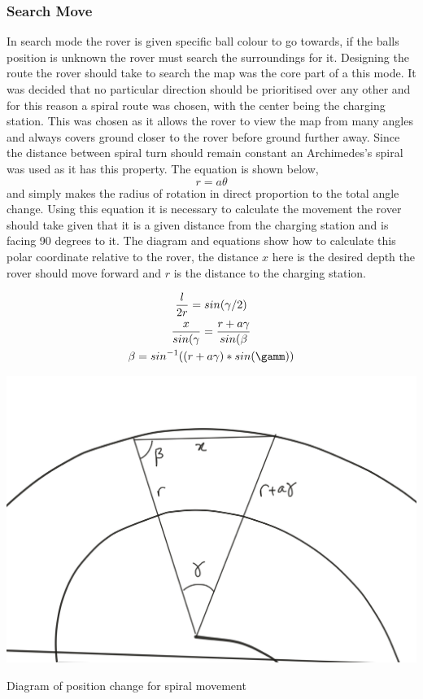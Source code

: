 \documentclass[10pt,twoside]{article}
\begin{document}
\subsubsection{Search Move}
In  search mode the rover is given specific ball colour to go towards, if the balls position is unknown the rover must search the surroundings for it. Designing the route the rover should take to search the map was the core part of a this mode. It was decided that no particular direction should be prioritised over any other and for this reason a spiral route was chosen, with the center being the charging station. This was chosen as it allows the rover to view the map from many angles and always covers ground closer to the rover before ground further away. Since the distance between spiral turn should remain constant an Archimedes's spiral was used as it has this property. The equation is shown below,
$$
r = a\theta
$$
and simply makes the radius of rotation in direct proportion to the total angle change. Using this equation it is necessary to calculate the movement the rover should take given that it is a given distance from the charging station and is facing 90 degrees to it. The diagram and equations show how to calculate this polar coordinate relative to the rover, the distance $x$ here is the desired depth the rover should move forward and $r$ is the distance to the charging station.
\begin{minipage}{.5\textwidth}
\begin{gather}
\frac{l}{2r}=sin(\gamma/2) \\
\frac{x}{sin(\gamma} = \frac{r+a\gamma}{sin(\beta} \\
\beta = sin^{-1}((r+a\gamma)*sin(\gamm))
\end{gather}
\end{minipage}
\begin{minipage}{.5\textwidth}
    \centering
    \includegraphics[scale = 0.1]{CommandSpiral.jpg}
    \caption{Diagram of position change for spiral movement}
    \label{fig:CommandFOV}
\end{minipage}
\end{document}

